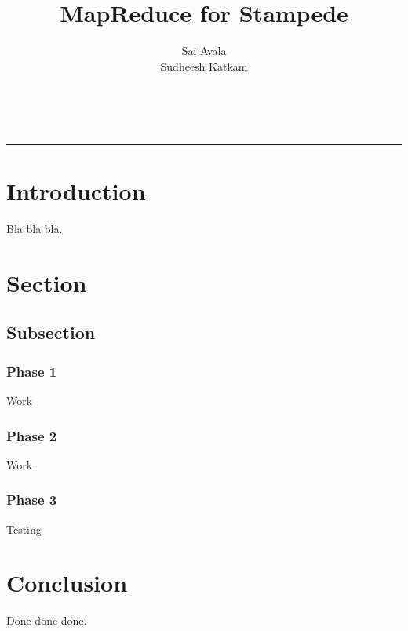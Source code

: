\documentclass[11pt]{article}
\title{MapReduce for Stampede}
\author{Sai Avala\\
    Sudheesh Katkam }
\begin{document}
\maketitle
\newpage
{}\\
\rule{6.0in}{.015in}
\tableofcontents
\newpage

\section{Introduction}
Bla bla bla.


\section{Section}
\subsection{Subsection}
\subsubsection*{Phase 1}
Work 
\subsubsection*{Phase 2}
Work
\subsubsection*{Phase 3}
Testing

\section{Conclusion}
Done done done.
\end{document}
